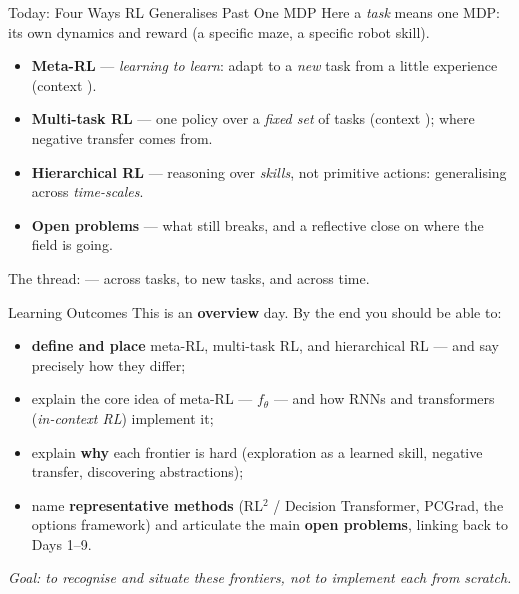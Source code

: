 \begin{frame}{Today: Four Ways RL Generalises Past One MDP}
\footnotesize Here a \emph{task} means one MDP: its own dynamics and reward (a specific
maze, a specific robot skill).\par\normalsize
\vspace{0.5em}
\begin{itemize}\itemsep0.5em
    \item \textbf{Meta-RL} --- \emph{learning to learn}: adapt to a \emph{new} task from a
          little experience (context ).
    \item \textbf{Multi-task RL} --- one policy over a \emph{fixed set} of tasks (context
          ); where negative transfer comes from.
    \item \textbf{Hierarchical RL} --- reasoning over \emph{skills}, not primitive actions:
          generalising across \emph{time-scales}.
    \item \textbf{Open problems} --- what still breaks, and a reflective close on where the
          field is going.
\end{itemize}
\vfill
\begin{center}
The thread:  --- across tasks, to new
tasks, and across time.
\end{center}
\end{frame}

\begin{frame}{Learning Outcomes}
This is an \textbf{overview} day. By the end you should be able to:
\begin{itemize}\itemsep0.3em
    \item \textbf{define and place} meta-RL, multi-task RL, and hierarchical RL --- and say
          precisely how they differ;
    \item explain the core idea of meta-RL ---  $f_\theta$
          --- and how RNNs and transformers (\emph{in-context RL}) implement it;
    \item explain \textbf{why} each frontier is hard (exploration as a learned skill,
          negative transfer, discovering abstractions);
    \item name \textbf{representative methods} (RL$^2$ / Decision Transformer, PCGrad, the
          options framework) and articulate the main \textbf{open problems}, linking back to
          Days 1--9.
\end{itemize}
\vspace{0.4em}
\begin{center}\footnotesize\itshape
Goal: to \emph{recognise and situate} these frontiers, not to implement each from scratch.
\end{center}
\end{frame}

